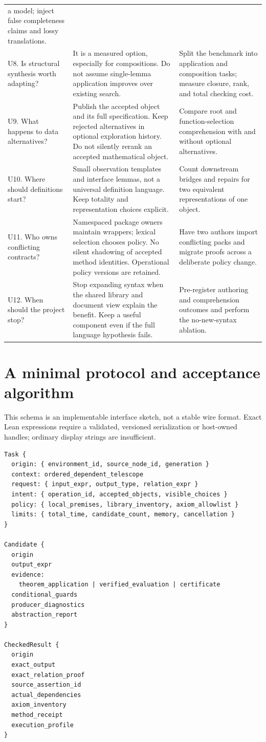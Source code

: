 \documentclass[11pt,letterpaper]{article}
\theoremstyle{definition}
\begin{document}
\begin{longtable}{@{}P{.21\textwidth}P{.43\textwidth}P{.28\textwidth}@{}}
a model; inject false completeness claims and lossy translations.\\
U8. Is structural synthesis worth adapting? & It is a measured option, especially
for compositions. Do not assume single-lemma application improves over existing
search. & Split the benchmark into application and composition tasks; measure
closure, rank, and total checking cost.\\
U9. What happens to data alternatives? & Publish the accepted object and its full
specification. Keep rejected alternatives in optional exploration history.
Do not silently rerank an accepted mathematical object. & Compare root and
function-selection comprehension with and without optional alternatives.\\
U10. Where should definitions start? & Small observation templates and interface
lemmas, not a universal definition language. Keep totality and representation
choices explicit. & Count downstream bridges and repairs for two equivalent
representations of one object.\\
U11. Who owns conflicting contracts? & Namespaced package owners maintain wrappers;
lexical selection chooses policy. No silent shadowing of accepted method identities.
Operational policy versions are retained. & Have two authors import conflicting
packs and migrate proofs across a deliberate policy change.\\
U12. When should the project stop? & Stop expanding syntax when the shared library
and document view explain the benefit. Keep a useful component even if the full
language hypothesis fails. & Pre-register authoring and comprehension outcomes
and perform the no-new-syntax ablation.\\
\bottomrule
\end{longtable}
\endgroup

\section{A minimal protocol and acceptance algorithm}\label{app:protocol}
This schema is an implementable interface sketch, not a stable wire format.
Exact Lean expressions require a validated, versioned serialization or host-owned
handles; ordinary display strings are insufficient.
\begin{lstlisting}
Task {
  origin: { environment_id, source_node_id, generation }
  context: ordered_dependent_telescope
  request: { input_expr, output_type, relation_expr }
  intent: { operation_id, accepted_objects, visible_choices }
  policy: { local_premises, library_inventory, axiom_allowlist }
  limits: { total_time, candidate_count, memory, cancellation }
}

Candidate {
  origin
  output_expr
  evidence:
    theorem_application | verified_evaluation | certificate
  conditional_guards
  producer_diagnostics
  abstraction_report
}

CheckedResult {
  origin
  exact_output
  exact_relation_proof
  source_assertion_id
  actual_dependencies
  axiom_inventory
  method_receipt
  execution_profile
}
\end{lstlisting}
\end{document}
